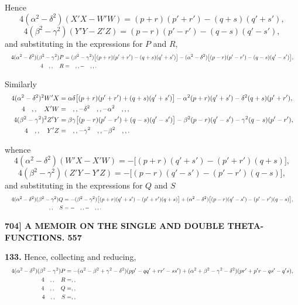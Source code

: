 \documentclass[11pt]{article}
\begin{document}
Hence
\[
4(\alpha^2 - \delta^2)(X'X - W'W) = (p + r)(p' + r') - (q + s)(q' + s'),
\]
\[
4(\beta^2 - \gamma^2)(Y'Y - Z'Z) = (p - r)(p' - r') - (q - s)(q' - s'),
\]
and substituting in the expressions for $P$ and $R$,
\[
\resizebox{\textwidth}{!}{$\displaystyle
\begin{aligned}
4(\alpha^2 - \delta^2)(\beta^2 - \gamma^2)P &= (\beta^2 - \gamma^2)\bigl[(p+r)(p'+r') - (q+s)(q'+s')\bigr] - (\alpha^2 - \delta^2)\bigl[(p-r)(p'-r') - (q-s)(q'-s')\bigr],\\
4\quad,,\quad R &= \quad,, - \quad,,.
\end{aligned}
$}
\]

\medskip
Similarly
\[
\resizebox{\textwidth}{!}{$\displaystyle
\begin{aligned}
4(\alpha^2 - \delta^2)^2 W'X &= \alpha\delta\bigl[(p+r)(p'+r') + (q+s)(q'+s')\bigr] - \alpha^2(p+r)(q'+s') - \delta^2(q+s)(p'+r'),\\
4\quad,,\quad X'W &= \quad,, - \delta^2\quad,, - \alpha^2\quad,,,\\
4(\beta^2 - \gamma^2)^2 Z'Y &= \beta\gamma\bigl[(p-r)(p'-r') + (q-s)(q'-s')\bigr] - \beta^2(p-r)(q'-s') - \gamma^2(q-s)(p'-r'),\\
4\quad,,\quad Y'Z &= \quad,, - \gamma^2\quad,, - \beta^2\quad,,.
\end{aligned}
$}
\]

whence
\[
4(\alpha^2 - \delta^2)(W'X - X'W) = -\bigl[(p+r)(q'+s') - (p'+r')(q+s)\bigr],
\]
\[
4(\beta^2 - \gamma^2)(Z'Y - Y'Z) = -\bigl[(p-r)(q'-s') - (p'-r')(q-s)\bigr],
\]
and substituting in the expressions for $Q$ and $S$
\[
\resizebox{\textwidth}{!}{$\displaystyle
\begin{aligned}
4(\alpha^2 - \delta^2)(\beta^2 - \gamma^2)Q &= -(\beta^2 - \gamma^2)\bigl[(p+r)(q'+s') - (p'+r')(q+s)\bigr] + (\alpha^2 - \delta^2)\bigl[(p-r)(q'-s') - (p'-r')(q-s)\bigr],\\
\quad,,\quad S &= -\quad,, - \quad,,.
\end{aligned}
$}
\]

\newpage
\noindent\textbf{704] \quad A MEMOIR ON THE SINGLE AND DOUBLE THETA-FUNCTIONS. \hfill 557}

\medskip
\textbf{133.} Hence, collecting and reducing,
\[
\resizebox{\textwidth}{!}{$\displaystyle
\begin{aligned}
4(\alpha^2 - \delta^2)(\beta^2 - \gamma^2)P &= -(\alpha^2 - \beta^2 + \gamma^2 - \delta^2)(pp' - qq' + rr' - ss') + (\alpha^2 + \beta^2 - \gamma^2 - \delta^2)(pr' + p'r - qs' - q's),\\
4\quad,,\quad R &= ,, \\
4\quad,,\quad Q &= ,, \\
4\quad,,\quad S &= ,,
\end{aligned}
$}
\]
\end{document}
